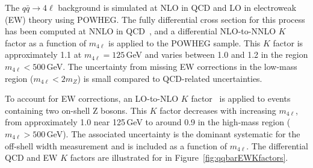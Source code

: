 The $q\bar{q} \to 4\ell$ background is simulated at NLO in QCD and LO in electroweak (EW) theory using POWHEG. The fully differential cross section for this process has been computed at NNLO in QCD~\cite{Grazzini:2015hta}, and a differential NLO-to-NNLO $K$ factor as a function of $m_{4\ell}$ is applied to the POWHEG sample. This $K$ factor is approximately 1.1 at $m_{4\ell} = 125$\,GeV and varies between 1.0 and 1.2 in the region $m_{4\ell} < 500$\,GeV. The uncertainty from missing EW corrections in the low-mass region ($m_{4\ell} < 2m_{Z}$) is small compared to QCD-related uncertainties.

To account for EW corrections, an LO-to-NLO $K$ factor~\cite{Bierweiler:2013dja} is applied to events containing two on-shell Z bosons. This $K$ factor decreases with increasing $m_{4\ell}$, from approximately 1.0 near 125\,GeV to around 0.9 in the high-mass region ($m_{4\ell} > 500$\,GeV). The associated uncertainty is the dominant systematic for the off-shell width measurement and is included as a function of $m_{4\ell}$. The differential QCD and EW $K$ factors are illustrated for in Figure~\ref{fig:qqbarEWKfactors}.


